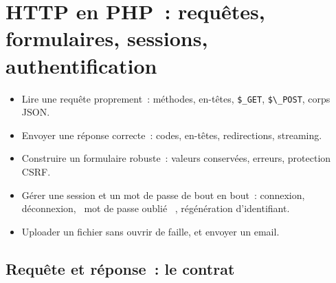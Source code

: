 \chapter{HTTP en PHP~: requ\^etes, formulaires, sessions, authentification}
\label{ch-php-http}

\begin{objectif}
\begin{itemize}
  \item Lire une requ\^ete proprement~: m\'ethodes, en-t\^etes, \verb|$_GET|, \verb|$\_POST|, corps JSON.
  \item Envoyer une r\'eponse correcte~: codes, en-t\^etes, redirections, streaming.
  \item Construire un formulaire robuste~: valeurs conserv\'ees, erreurs, protection CSRF.
  \item G\'erer une session et un mot de passe de bout en bout~: connexion, d\'econnexion,
        \og ~mot de passe oubli\'e~ \fg{}, r\'eg\'en\'eration d'identifiant.
  \item Uploader un fichier sans ouvrir de faille, et envoyer un email.
\end{itemize}
\end{objectif}

\section{Requ\^ete et r\'eponse~: le contrat}

